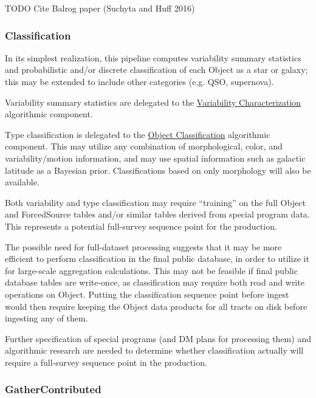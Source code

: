 \begin{note}{TODO}
Cite Balrog paper (Suchyta and  Huff 2016)
\end{note}

\subsubsection{Classification}
\label{sec:drpClassification}

In its simplest realization, this pipeline computes variability summary statistics and probabilistic and/or discrete classification of each Object as a star or galaxy; this may be extended to include other categories (e.g. QSO, supernova).

Variability summary statistics are delegated to the \hyperref[sec:acVariabilityCharacterization]{Variability Characterization} algorithmic component.

Type classification is delegated to the \hyperref[sec:acObjectClassification]{Object Classification} algorithmic component.  This may utilize any combination of morphological, color, and variability/motion information, and may use spatial information such as galactic latitude as a Bayesian prior.  Classifications based on only morphology will also be available.

Both variability and type classification may require ``training'' on the full Object and ForcedSource tables and/or similar tables derived from special program data.  This represents a potential full-survey sequence point for the production.

The possible need for full-dataset processing suggests that it may be more efficient to perform classification in the final public database, in order to utilize it for large-scale aggregation calculations.  This may not be feasible if final public database tables are write-once, as classification may require both read and write operations on Object.  Putting the classification sequence point before ingest would then require keeping the Object data products for all tracts on disk before ingesting any of them.

Further specification of special programs (and DM plans for processing them) and algorithmic research are needed to determine whether classification actually will require a full-survey sequence point in the production.

\subsubsection{GatherContributed}
\label{sec:drpGatherContributed}

